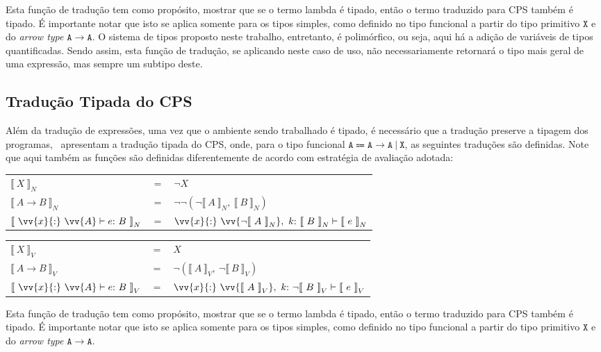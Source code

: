 \phantom{Newline}

\noindent Esta função de tradução tem como propósito, mostrar que se o termo lambda é tipado, então o termo traduzido para CPS também é tipado.
É importante notar que isto se aplica somente para os tipos simples, como definido no tipo funcional a partir do tipo primitivo $\mathtt{X}$ e do \textit{arrow type} $\mathtt{A \to A}$.
O sistema de tipos proposto neste trabalho, entretanto, é polimórfico, ou seja, aqui há a adição de variáveis de tipos quantificadas.
Sendo assim, esta função de tradução, se aplicando neste caso de uso, não necessariamente retornará o tipo mais geral de uma expressão, mas sempre um subtipo deste.

\subsection{Tradução Tipada do CPS}\label{subsec:typed-cps-translation}
Além da tradução de expressões, uma vez que o ambiente sendo trabalhado é tipado, é necessário que a tradução preserve a tipagem dos programas,~ apresentam a tradução tipada do CPS, onde, para o tipo funcional $\mathtt{A \Coloneqq A \to A\ |\ X}$, as seguintes traduções são definidas.
Note que aqui também as funções são definidas diferentemente de acordo com estratégia de avaliação adotada:

\phantom{Newline}

\begin{tabular}{lcl}
     ${\llbracket\ X\ \rrbracket}_N$ & $=$ & $\neg X$ \\ 
     ${\llbracket\ A \rightarrow B\ \rrbracket}_N$ & $=$ & $\neg\neg(\neg{\llbracket\ A\ \rrbracket}_N,\ {\llbracket\ B\ \rrbracket}_N)$ \\ 
     ${\llbracket\ \vv{x}{:}\ \vv{A} \vdash e{:}\ B\ \rrbracket}_N$ & $=$ & $\vv{x}{:}\ \vv{\neg{\llbracket\ A\ \rrbracket}_N},\ k{:}\ {\llbracket\ B\ \rrbracket}_N \vdash {\llbracket\ e\ \rrbracket}_N$ \\ 
\end{tabular}

\phantom{Newline}

\begin{tabular}{lcl}
     ${\llbracket\ X\ \rrbracket}_V$ & $=$ & $X$ \\ 
     ${\llbracket\ A \rightarrow B\ \rrbracket}_V$ & $=$ & $\neg({\llbracket\ A\ \rrbracket}_V,\ \neg{\llbracket\ B\ \rrbracket}_V)$ \\ 
     ${\llbracket\ \vv{x}{:}\ \vv{A} \vdash e{:}\ B\ \rrbracket}_V$ & $=$ & $\vv{x}{:}\ \vv{{\llbracket\ A\ \rrbracket}_V},\ k{:}\ \neg{\llbracket\ B\ \rrbracket}_V \vdash {\llbracket\ e\ \rrbracket}_V$ \\ 
\end{tabular}

\phantom{Newline}

\noindent Esta função de tradução tem como propósito, mostrar que se o termo lambda é tipado, então o termo traduzido para CPS também é tipado.
É importante notar que isto se aplica somente para os tipos simples, como definido no tipo funcional a partir do tipo primitivo $\mathtt{X}$ e do \textit{arrow type} $\mathtt{A \to A}$.
